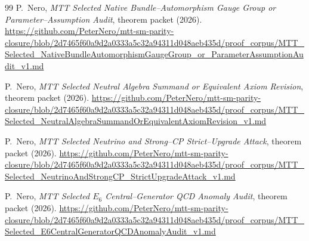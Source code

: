 \documentclass[11pt]{article}
\theoremstyle{plain}
\theoremstyle{definition}
\theoremstyle{remark}
\begin{document}
\begin{thebibliography}{99}
P.~Nero,
\emph{MTT Selected Native Bundle--Automorphism Gauge Group or
Parameter--Assumption Audit}, theorem packet (2026).
\url{https://github.com/PeterNero/mtt-sm-parity-closure/blob/2d7465f60a9d2a0333a5c32a94311d048aeb435d/proof_corpus/MTT_Selected_NativeBundleAutomorphismGaugeGroup_or_ParameterAssumptionAudit_v1.md}

P.~Nero,
\emph{MTT Selected Neutral Algebra Summand or Equivalent Axiom Revision},
theorem packet (2026).
\url{https://github.com/PeterNero/mtt-sm-parity-closure/blob/2d7465f60a9d2a0333a5c32a94311d048aeb435d/proof_corpus/MTT_Selected_NeutralAlgebraSummandOrEquivalentAxiomRevision_v1.md}

P.~Nero,
\emph{MTT Selected Neutrino and Strong--CP Strict--Upgrade Attack}, theorem
packet (2026).
\url{https://github.com/PeterNero/mtt-sm-parity-closure/blob/2d7465f60a9d2a0333a5c32a94311d048aeb435d/proof_corpus/MTT_Selected_NeutrinoAndStrongCP_StrictUpgradeAttack_v1.md}

P.~Nero,
\emph{MTT Selected $E_6$ Central--Generator QCD Anomaly Audit}, theorem packet
(2026).
\url{https://github.com/PeterNero/mtt-sm-parity-closure/blob/2d7465f60a9d2a0333a5c32a94311d048aeb435d/proof_corpus/MTT_Selected_E6CentralGeneratorQCDAnomalyAudit_v1.md}

\end{thebibliography}
\end{document}
